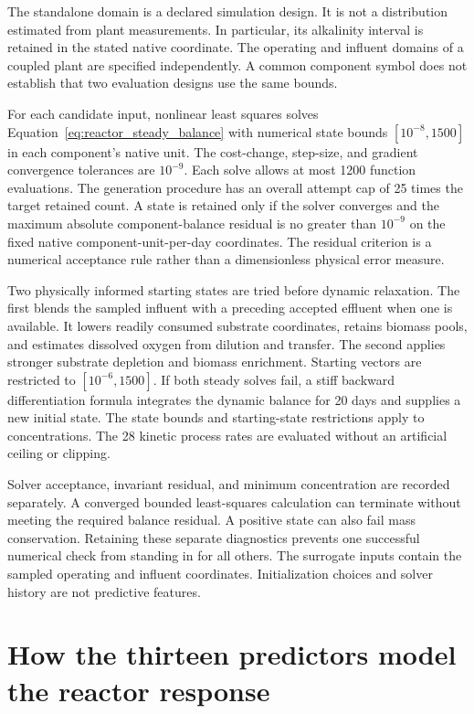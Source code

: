 The standalone domain is a declared simulation design. It is not a distribution estimated from plant measurements. In particular, its alkalinity interval is retained in the stated native coordinate. The operating and influent domains of a coupled plant are specified independently. A common component symbol does not establish that two evaluation designs use the same bounds.

For each candidate input, nonlinear least squares solves Equation~\eqref{eq:reactor_steady_balance} with numerical state bounds $[10^{-8},1500]$ in each component's native unit. The cost-change, step-size, and gradient convergence tolerances are $10^{-9}$. Each solve allows at most 1200 function evaluations. The generation procedure has an overall attempt cap of 25 times the target retained count. A state is retained only if the solver converges and the maximum absolute component-balance residual is no greater than $10^{-9}$ on the fixed native component-unit-per-day coordinates. The residual criterion is a numerical acceptance rule rather than a dimensionless physical error measure.

Two physically informed starting states are tried before dynamic relaxation. The first blends the sampled influent with a preceding accepted effluent when one is available. It lowers readily consumed substrate coordinates, retains biomass pools, and estimates dissolved oxygen from dilution and transfer. The second applies stronger substrate depletion and biomass enrichment. Starting vectors are restricted to $[10^{-6},1500]$. If both steady solves fail, a stiff backward differentiation formula integrates the dynamic balance for 20 days and supplies a new initial state. The state bounds and starting-state restrictions apply to concentrations. The 28 kinetic process rates are evaluated without an artificial ceiling or clipping.

Solver acceptance, invariant residual, and minimum concentration are recorded separately. A converged bounded least-squares calculation can terminate without meeting the required balance residual. A positive state can also fail mass conservation. Retaining these separate diagnostics prevents one successful numerical check from standing in for all others. The surrogate inputs contain the sampled operating and influent coordinates. Initialization choices and solver history are not predictive features.

\section{How the thirteen predictors model the reactor response}


